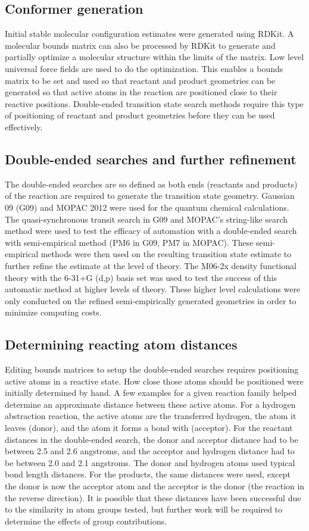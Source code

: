 \documentclass[11pt]{article}
\begin{document}
\subsection{Conformer generation}
Initial stable molecular configuration estimates were generated using RDKit. A molecular bounds matrix can also be processed by RDKit to generate and partially optimize a molecular structure within the limits of the matrix. Low level universal force fields are used to do the optimization. This enables a bounds matrix to be set and used so that reactant and product geometries can be generated so that active atoms in the reaction are positioned close to their reactive positions. Double-ended transition state search methods require this type of positioning of reactant and product geometries before they can be used effectively.

\subsection{Double-ended searches and further refinement}
The double-ended searches are so defined as both ends (reactants and products) of the reaction are required to generate the transition state geometry. Gaussian 09 (G09) and MOPAC 2012 were used for the quantum chemical calculations. The quasi-synchronous transit search in G09 and MOPAC's string-like search method were used to test the efficacy of automation with a double-ended search with semi-empirical method (PM6 in G09, PM7 in MOPAC). These semi-empirical methods were then used on the resulting transition state estimate to further refine the estimate at the level of theory. The M06-2x density functional theory with the 6-31+G (d,p) basis set was used to test the success of this automatic method at higher levels of theory. These higher level calculations were only conducted on the refined semi-empirically generated geometries in order to minimize computing costs.

\subsection{Determining reacting atom distances}
Editing bounds matrices to setup the double-ended searches requires positioning active atoms in a reactive state. How close those atoms should be positioned were initially determined by hand. A few examples for a given reaction family helped determine an approximate distance between these active atoms. For a hydrogen abstraction reaction, the active atoms are the transferred hydrogen, the atom it leaves (donor), and the atom it forms a bond with (acceptor). For the reactant distances in the double-ended search, the donor and acceptor distance had to be between 2.5 and 2.6 angstroms, and the acceptor and hydrogen distance had to be between 2.0 and 2.1 angstroms. The donor and hydrogen atoms used typical bond length distances. For the products, the same distances were used, except the donor is now the acceptor atom and the acceptor is the donor (the reaction in the reverse direction). It is possible that these distances have been successful due to the similarity in atom groups tested, but further work will be required to determine the effects of group contributions.
\end{document}
